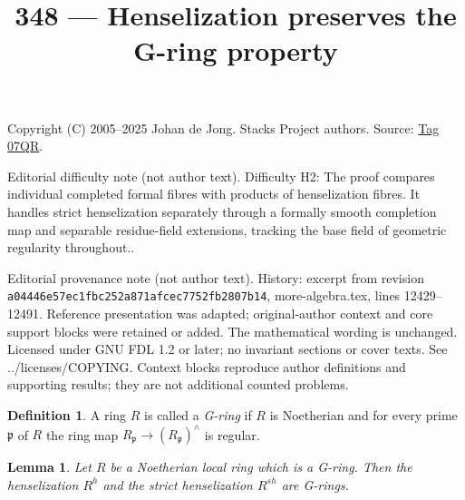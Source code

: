 \documentclass{amsart}
\theoremstyle{plain}
\newtheorem{lemma}[subsection]{Lemma}
\theoremstyle{definition}
\newtheorem{definition}[subsection]{Definition}
\theoremstyle{remark}
\numberwithin{equation}{subsection}
\begin{document}
\title[Stacks Project, Tag 07QR]{348 --- Henselization preserves the G-ring property}
\maketitle
\noindent Copyright (C) 2005--2025 Johan de Jong. Stacks Project authors. Source: \href{https://stacks.math.columbia.edu/tag/07QR}{Tag 07QR}.

\noindent Editorial difficulty note (not author text). Difficulty H2: The proof compares individual completed formal fibres with products of henselization fibres. It handles strict henselization separately through a formally smooth completion map and separable residue-field extensions, tracking the base field of geometric regularity throughout..

\noindent Editorial provenance note (not author text). History: excerpt from revision \texttt{a0444\allowbreak 6e57e\allowbreak c1fbc\allowbreak 252a8\allowbreak 71afc\allowbreak ec775\allowbreak 2fb28\allowbreak 07b14}, more-algebra.tex, lines 12429--12491. Reference presentation was adapted; original-author context and core support blocks were retained or added. The mathematical wording is unchanged. Licensed under GNU FDL 1.2 or later; no invariant sections or cover texts. See ../licenses/COPYING. Context blocks reproduce author definitions and supporting results; they are not additional counted problems.

\begin{definition}
\label{definition-G-ring}
A ring $R$ is called a {\it G-ring} if $R$ is Noetherian and for every
prime $\mathfrak p$ of $R$ the ring map
$R_\mathfrak p \to (R_\mathfrak p)^\wedge$ is regular.
\end{definition}

\begin{lemma}
\label{lemma-henselization-G-ring}
Let $R$ be a Noetherian local ring which is a G-ring.
Then the henselization $R^h$ and the strict henselization $R^{sh}$
are G-rings.
\end{lemma}
\end{document}

